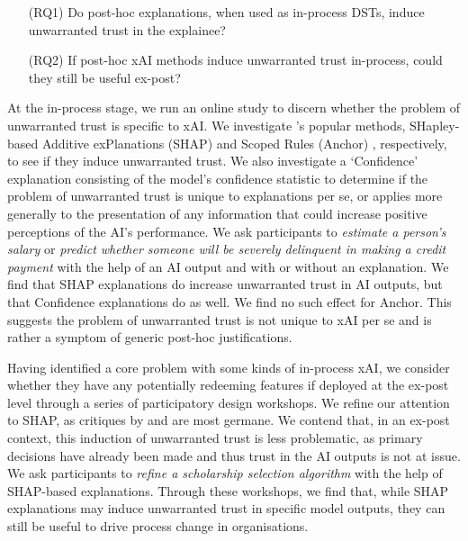 \begin{enumerate}
    \item[(RQ1)] Do post-hoc explanations, when used as in-process DSTs, induce unwarranted trust in the explainee?
    \item[(RQ2)] If post-hoc xAI methods induce unwarranted trust in-process, could they still be useful ex-post?
\end{enumerate}

At the in-process stage, we run an online study to discern whether the problem of unwarranted trust is specific to xAI. We investigate \textcite{lundberg_unified_2017,ribeiro_anchors_2018}'s popular methods, SHapley-based Additive exPlanations (SHAP) \cite{lundberg_unified_2017} and Scoped Rules (Anchor) \cite{ribeiro_anchors_2018}, respectively, to see if they induce unwarranted trust. We also investigate a `Confidence' explanation consisting of the model's confidence statistic to determine if the problem of unwarranted trust is unique to explanations per se, or applies more generally to the presentation of any information that could increase positive perceptions of the AI's performance. We ask participants to \emph{estimate a person's salary} \cite{kohavi_scaling_1996} or \emph{predict whether someone will be severely delinquent in making a credit payment} \cite{GiveMeSomeCredit} with the help of an AI output and with or without an explanation. We find that SHAP explanations do increase unwarranted trust in AI outputs, but that Confidence explanations do as well. We find no such effect for Anchor. This suggests the problem of unwarranted trust is not unique to xAI per se and is rather a symptom of generic post-hoc justifications.

Having identified a core problem with some kinds of in-process xAI, we consider whether they have any potentially redeeming features if deployed at the ex-post level through a series of participatory design workshops. We refine our attention to SHAP, as critiques by \textcite{Lipton} and \textcite{miller_explainable_2023} are most germane. We contend that, in an ex-post context, this induction of unwarranted trust is less problematic, as primary decisions have already been made and thus trust in the AI outputs is not at issue. We ask participants to \emph{refine a scholarship selection algorithm} with the help of SHAP-based explanations. Through these workshops, we find that, while SHAP explanations may induce unwarranted trust in specific model outputs, they can still be useful to drive process change in organisations.


